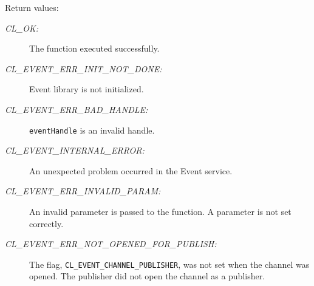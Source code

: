 \begin{flushleft}
\begin{Desc}
\end{Desc}
\begin{Desc}
\item[Return values:]
\begin{description}
\item[{\em CL\_\-OK:}]The function executed successfully. 
\item[{\em CL\_\-EVENT\_\-ERR\_\-INIT\_\-NOT\_\-DONE:}]Event library is not initialized. 
\item[{\em CL\_\-EVENT\_\-ERR\_\-BAD\_\-HANDLE:}]{\tt{eventHandle}} is an invalid handle.
\item[{\em CL\_\-EVENT\_\-INTERNAL\_\-ERROR:}]An unexpected problem occurred in the Event service. 
\item[{\em CL\_\-EVENT\_\-ERR\_\-INVALID\_\-PARAM:}]An invalid parameter is passed to the function. A parameter is not set correctly.
\item[{\em CL\_\-EVENT\_\-ERR\_\-NOT\_\-OPENED\_\-FOR\_\-PUBLISH:}]The flag, {\tt{CL\_\-EVENT\_\-CHANNEL\_\-PUBLISHER}}, was not set when the channel was 
opened. The publisher did not open the channel as a publisher.


\end{description}
\end{Desc}
\end{flushleft}
